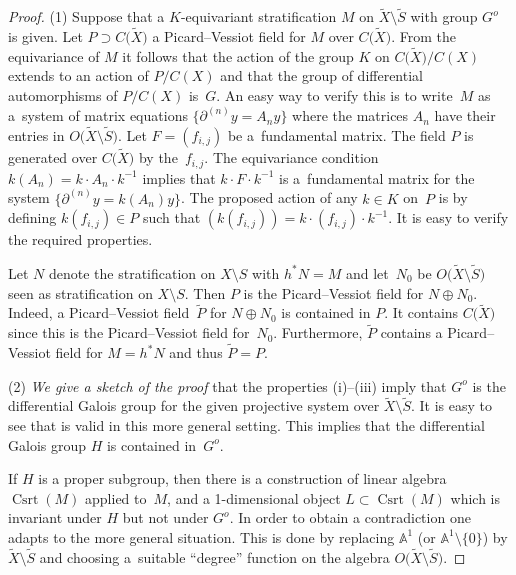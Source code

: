 \documentclass[10pt,a4paper]{amsart}
\numberwithin{equation}{section}
\begin{document}
\begin{proof} (1) Suppose that a $K$-equivariant stratification $M$ on $\tilde{X}\setminus \tilde{S}$ with group $G^o$ is given. Let $P\supset C\big(\tilde{X}\big)$ a Picard--Vessiot field for $M$ over $C\big(\tilde{X}\big)$. From the equivariance of $M$ it follows that the action of the group $K$ on $C\big(\tilde{X}\big)/C(X)$ extends to an action of $P/C(X)$ and that the group of differential automorphisms of $P/C(X)$ is~$G$. An easy way to verify this is to write~$M$ as a~system of matrix equations $\big\{\partial^{(n)}y=A_ny\big\}$ where the matrices $A_n$ have their entries in $O\big(\tilde{X}\setminus \tilde{S}\big)$. Let $F=(f_{i,j})$ be a~fundamental matrix. The field $P$ is generated over $C\big(\tilde{X}\big)$ by the~$f_{i,j}$. The equivariance condition $k(A_n)= k\cdot A_n\cdot k^{-1}$ implies that $k\cdot F\cdot k^{-1}$ is a~fundamental matrix for the system $\big\{\partial ^{(n)}y=k(A_n)y\big\}$. The proposed action of any $k\in K$ on~$P$ is by defining $k(f_{i,j})\in P$ such that $(k(f_{i,j}))=k\cdot (f_{i,j})\cdot k^{-1}$. It is easy to verify the required properties.

Let $N$ denote the stratification on $X\setminus S$ with $h^*N=M$ and let~$N_0$ be $O\big(\tilde{X}\setminus \tilde{S}\big)$ seen as stratification on $X\setminus S$. Then $P$ is the Picard--Vessiot field for $N\oplus N_0$. Indeed, a Picard--Vessiot field~$\tilde{P}$ for $N\oplus N_0$ is contained in $P$. It contains $C\big(\tilde{X}\big)$ since this is the Picard--Vessiot field for~$N_0$. Furthermore, $\tilde{P}$ contains a Picard--Vessiot field for $M=h^*N$ and thus $\tilde{P}=P$.

(2) {\it We give a sketch of the proof} that the properties (i)--(iii) imply that $G^o$ is the differential Galois group for the given projective system over $\tilde{X}\setminus \tilde{S}$. It is easy to see that \cite[Proposition~5.3]{Ma-vdP1} is valid in this more general setting. This implies that the differential Galois group $H$ is contained in~$G^o$.

If $H$ is a proper subgroup, then there is a construction of linear algebra $\operatorname{Csrt}(M)$ applied to~$M$, and a 1-dimensional object $L\subset \operatorname{Csrt}(M)$ which is invariant under $H$ but not under $G^o$. In order to obtain a contradiction one adapts \cite[Lemma~7.4]{Ma-vdP1} to the more general situation. This is done by replacing
$\mathbb{A}^1$ (or $\mathbb{A}^1\setminus \{0\}$) by $\tilde{X}\setminus \tilde{S}$ and choosing a~suitable ``degree'' function on the algebra $O\big(\tilde{X}\setminus \tilde{S}\big)$. \end{proof}
\end{document}
